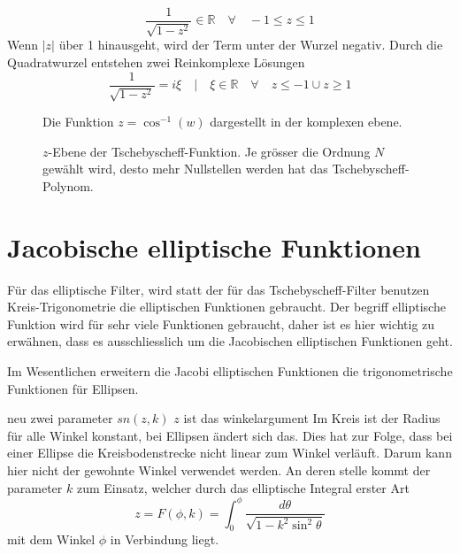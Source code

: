 \begin{refsection}
\begin{equation}
    \frac{
        1
    }{
        \sqrt{
            1-z^2
        }
    }
    \in \mathbb{R}
    \quad
    \forall
    \quad
    -1  \leq z \leq 1
\end{equation}
Wenn $|z|$ über 1 hinausgeht, wird der Term unter der Wurzel negativ.
Durch die Quadratwurzel entstehen zwei Reinkomplexe Lösungen
\begin{equation}
    \frac{
        1
    }{
        \sqrt{
            1-z^2
        }
    }
    = i \xi \quad | \quad \xi \in \mathbb{R}
    \quad
    \forall
    \quad
    z \leq -1 \cup z \geq 1
\end{equation}

\begin{figure}
    \centering
    
    \caption{Die Funktion $z = \cos^{-1}(w)$ dargestellt in der komplexen ebene.}
    \label{ellfilter:fig:arccos}
\end{figure}



\begin{figure}
    \centering
    
    \caption{
        $z$-Ebene der Tschebyscheff-Funktion.
        Je grösser die Ordnung $N$ gewählt wird, desto mehr Nullstellen werden hat das Tschebyscheff-Polynom.
    }
\end{figure}








\section{Jacobische elliptische Funktionen}


Für das elliptische Filter, wird statt der für das Tschebyscheff-Filter benutzen Kreis-Trigonometrie die elliptischen Funktionen gebraucht.
Der begriff elliptische Funktion wird für sehr viele Funktionen gebraucht, daher ist es hier wichtig zu erwähnen, dass es ausschliesslich um die Jacobischen elliptischen Funktionen geht.

Im Wesentlichen erweitern die Jacobi elliptischen Funktionen die trigonometrische Funktionen für Ellipsen.


neu zwei parameter
$sn(z, k)$
$z$ ist das winkelargument
Im Kreis ist der Radius für alle Winkel konstant, bei Ellipsen ändert sich das.
Dies hat zur Folge, dass bei einer Ellipse die Kreisbodenstrecke nicht linear zum Winkel verläuft.
Darum kann hier nicht der gewohnte Winkel verwendet werden.
An deren stelle kommt der parameter $k$ zum Einsatz, welcher durch das elliptische Integral erster Art
\begin{equation}
    z
    =
    F(\phi, k)
    =
    \int_{0}^{\phi}
    \frac{
        d\theta
    }{
        \sqrt{
            1-k^2 \sin^2 \theta
        }
    }
\end{equation}
mit dem Winkel $\phi$ in Verbindung liegt.





\end{refsection}
